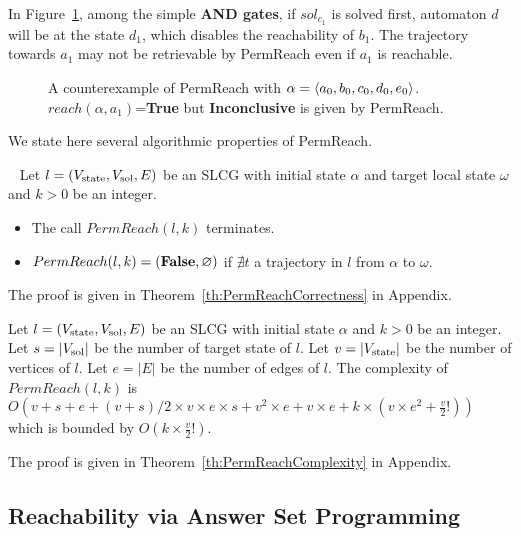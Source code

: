 \begin{example}\label{ex:counterPerm}
In Figure~\ref{FigConflictInForks}, among the simple \textbf{AND gates}, if $sol_{c_1}$ is solved first, automaton $d$ will be at the state $d_1$, which disables the reachability of $b_1$.
The trajectory towards $a_1$ may not be retrievable by PermReach even if $a_1$ is reachable.
\end{example}

\begin{figure}[ht]
\centering

\caption[Counterexample of PermReach]{A counterexample of PermReach with $\alpha=\langle a_0,b_0,c_0,d_0,e_0\rangle$. 
$reach(\alpha,a_1)$=\textbf{True} but \textbf{Inconclusive} is given by PermReach.
}\label{FigConflictInForks}
\end{figure}

We state here several algorithmic properties of PermReach.

\begin{theorem}~
    Let $l=(V_{\mathrm{state}}, V_{\mathrm{sol}}, E)$ be an SLCG with initial state $\alpha$ and target local state $\omega$ and $k > 0$ be an integer.
    \begin{itemize}
        \item The call $PermReach(l,k)$ terminates.
        \item $PermReach(l,k)=(\mathbf{False},\varnothing)$ if $\nexists t$ a trajectory in $l$ from $\alpha$ to $\omega$.
    \end{itemize}
    
    The proof is given in Theorem~\ref{th:PermReachCorrectness} in Appendix.
\end{theorem}

\begin{theorem}
    Let $l=(V_{\mathrm{state}},V_{\mathrm{sol}}, E)$ be an SLCG with initial state $\alpha$ and $k > 0$ be an integer.
    Let $s=|V_{\mathrm{sol}}|$ be the number of target state of $l$.
    Let $v = |V_{\mathrm{state}}|$ be the number of vertices of $l$.
    Let $e=|E|$ be the number of edges of $l$.
    The complexity of $PermReach(l,k)$ is $O(v + s + e + (v+s) / 2 \times v \times e \times s + v^{2} \times e + v \times e + k \times (v \times e^{2} + \frac{v}{2}!))$ which is bounded by $O(k \times \frac{v}{2}!)$.
    
    The proof is given in Theorem~\ref{th:PermReachComplexity} in Appendix.
\end{theorem}

\subsection{Reachability via Answer Set Programming}\label{sec:aspreach}
\roux{}{[PermReach]}

